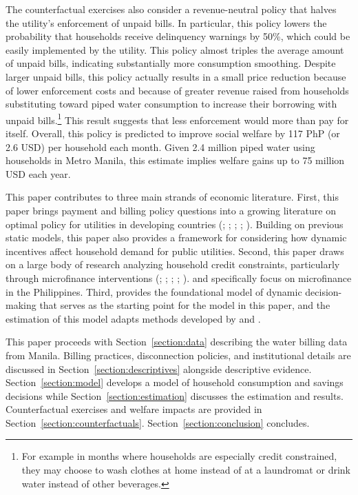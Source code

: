 \documentclass[12pt,table]{article}
\begin{document}
The counterfactual exercises also consider a revenue-neutral policy that halves the utility's enforcement of unpaid bills.  In particular, this policy lowers the probability that households receive delinquency warnings by 50\%, which could be easily implemented by the utility.  This policy almost triples the average amount of unpaid bills, indicating substantially more consumption smoothing.  Despite larger unpaid bills, this policy actually results in a small price reduction because of lower enforcement costs and because of greater revenue raised from households substituting toward piped water consumption to increase their borrowing with unpaid bills.\footnote{For example in months where households are especially credit constrained, they may choose to wash clothes at home instead of at a laundromat or drink water instead of other beverages.}  This result suggests that less enforcement would more than pay for itself.  Overall, this policy is predicted to improve social welfare by 117 PhP (or 2.6 USD) per household each month.  Given 2.4 million piped water using households in Metro Manila, this estimate implies welfare gains up to 75 million USD each year.

This paper contributes to three main strands of economic literature.  First, this paper brings payment and billing policy questions into a growing literature on optimal policy for utilities in developing countries (\cite{mcrae2015infrastructure}; \cite{szabo2015value}; \cite{jack2016charging}; \cite{jack2015pay}; \cite{szabo2015reducing}).  Building on previous static models, this paper also provides a framework for considering how dynamic incentives affect household demand for public utilities.  Second, this paper draws on a large body of research analyzing household credit constraints, particularly through microfinance interventions (\cite{morduch1999microfinance}; \cite{morduch1995income}; \cite{cull2009microfinance}; \cite{dupas2013savings}; \cite{jack2016borrowing}).  \cite{karlan2009expanding} and \cite{gine2014group} specifically focus on microfinance in the Philippines. Third, \cite{deaton1991saving} provides the foundational model of dynamic decision-making that serves as the starting point for the model in this paper, and the estimation of this model adapts methods developed by \cite{gourinchas2002consumption} and \cite{laibson2007estimating}.

This paper proceeds with Section~\ref{section:data} describing the water billing data from Manila.  Billing practices, disconnection policies, and institutional details are discussed in Section~\ref{section:descriptives} alongside descriptive evidence.  Section~\ref{section:model} develops a model of household consumption and savings decisions while Section~\ref{section:estimation} discusses the estimation and results.  Counterfactual exercises and welfare impacts are provided in Section~\ref{section:counterfactuals}.  Section~\ref{section:conclusion} concludes. 
\end{document}
